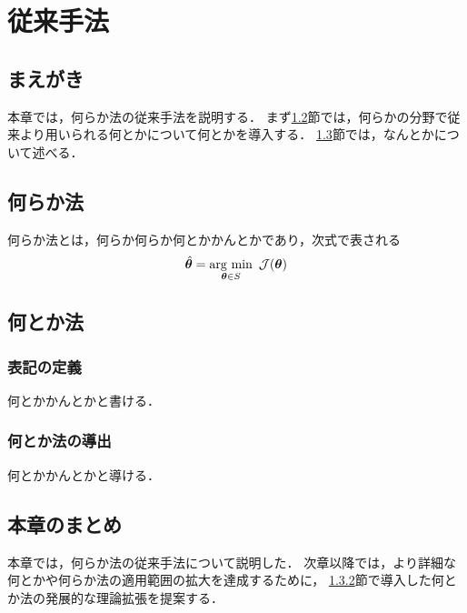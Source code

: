 \chapter{従来手法}
\label{chap:conv}

\section{まえがき}
本章では，何らか法の従来手法を説明する．
まず\ref{sec:conv:something}節では，何らかの分野で従来より用いられる何とかについて何とかを導入する．
\ref{sec:conv:somewhat}節では，なんとかについて述べる．

\section{何らか法}
\label{sec:conv:something}

何らか法とは，何らか何らか何とかかんとかであり，次式で表される
\begin{align}
  \hat{\bm{\theta}} = \argmin_{\bm{\theta} \in S} \ \mathcal{J}(\bm{\theta})
\end{align}

\section{何とか法}
\label{sec:conv:somewhat}

\subsection{表記の定義}
\label{sec:conv:somewhat:definition}
何とかかんとかと書ける．

\subsection{何とか法の導出}
\label{sec:conv:somewhat:derivation}
何とかかんとかと導ける．

\section{本章のまとめ}
本章では，何らか法の従来手法について説明した．
次章以降では，より詳細な何とかや何らか法の適用範囲の拡大を達成するために，
\ref{sec:conv:somewhat:derivation}節で導入した何とか法の発展的な理論拡張を提案する．

